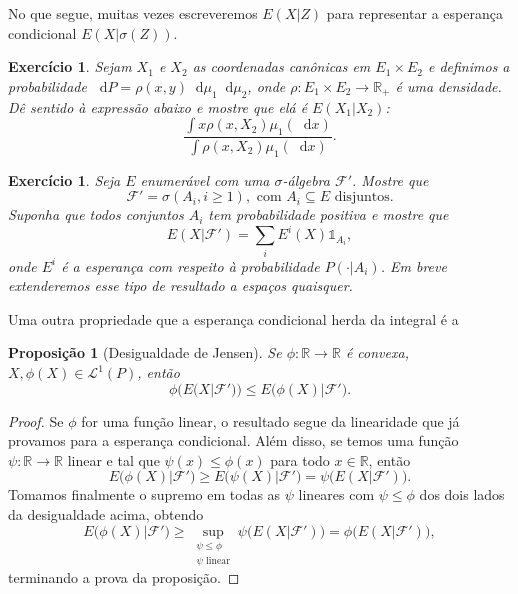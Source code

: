 \documentclass[reqno, draft]{book}
\newcommand*\1{\mathds{1}}
\newtheorem{proposition}[theorem]{Proposição}
\newtheorem{exercise}[example]{Exercício}
\renewcommand*\d{\mathop{}\!\mathrm{d}}
\begin{document}
No que segue, muitas vezes escreveremos $E(X|Z)$ para representar a esperança condicional $E(X|\sigma(Z))$.

\begin{exercise}
  Sejam $X_1$ e $X_2$ as coordenadas canônicas em $E_1 \times E_2$ e definimos a probabilidade $\d P = \rho(x,y) \d \mu_1 \d \mu_2$, onde $\rho:E_1 \times E_2 \to \mathbb{R}_+$ é uma densidade.
  Dê sentido à expressão abaixo e mostre que elá é $E(X_1|X_2)$:
  \begin{equation}
     \frac{\int x\rho(x, X_2) \mu_1(\d x)}{\int \rho(x, X_2) \mu_1(\d x)}.
  \end{equation}
\end{exercise}

\begin{exercise}
  Seja $E$ enumerável com uma $\sigma$-álgebra $\mathcal{F}'$.
  Mostre que
  \begin{equation}
    \mathcal{F}' = \sigma(A_i, i \geq 1), \text{ com $A_i \subseteq E$ disjuntos}.
  \end{equation}
  Suponha que todos conjuntos $A_i$ tem probabilidade positiva e mostre que
  \begin{equation}
    E(X|\mathcal{F}') = \sum_i E^i(X) \1_{A_i},
  \end{equation}
  onde $E^i$ é a esperança com respeito à probabilidade $P(\cdot|A_i)$.
  Em breve extenderemos esse tipo de resultado a espaços quaisquer.
\end{exercise}

Uma outra propriedade que a esperança condicional herda da integral é a

\begin{proposition}[Desigualdade de Jensen]
  Se $\phi:\mathbb{R} \to \mathbb{R}$ é convexa, $X, \phi(X) \in \mathcal{L}^1(P)$, então
  \begin{equation}
    \phi\big( E(X|\mathcal{F}') \big) \leq E\big( \phi(X) | \mathcal{F}' \big).
  \end{equation}
\end{proposition}

\begin{proof}
  Se $\phi$ for uma função linear, o resultado segue da linearidade que já provamos para a esperança condicional.
  Além disso, se temos uma função $\psi:\mathbb{R} \to \mathbb{R}$ linear e tal que $\psi(x) \leq \phi(x)$ para todo $x \in \mathbb{R}$, então
  \begin{equation}
    E\big( \phi(X) | \mathcal{F}' \big) \geq E\big( \psi(X) | \mathcal{F}' \big) = \psi \big( E(X|\mathcal{F}') \big).
  \end{equation}
  Tomamos finalmente o supremo em todas as $\psi$ lineares com $\psi \leq \phi$ dos dois lados da desigualdade acima, obtendo
  \begin{equation}
    E\big( \phi(X) | \mathcal{F}' \big) \geq \sup_{\substack{\psi \leq \phi\\\psi \text{ linear}}} \psi \big( E(X|\mathcal{F}') \big) = \phi \big( E(X|\mathcal{F}') \big),
  \end{equation}
  terminando a prova da proposição.
\end{proof}
\end{document}

